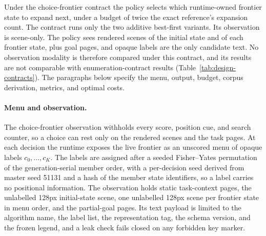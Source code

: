 Under the choice-frontier contract the policy selects which runtime-owned frontier state to expand next, under a budget of twice the exact reference's expansion count. The contract runs only the two additive best-first variants. Its observation is scene-only. The policy sees rendered scenes of the initial state and of each frontier state, plus goal pages, and opaque labels are the only candidate text. No observation modality is therefore compared under this contract, and its results are not comparable with enumeration-contract results (Table~\ref{tab:design-contracts}). The paragraphs below specify the menu, output, budget, corpus derivation, metrics, and optimal costs.

\paragraph{Menu and observation.}
The choice-frontier observation withholds every score, position cue, and search counter, so a choice can rest only on the rendered scenes and the task pages. At each decision the runtime exposes the live frontier as an unscored menu of opaque labels $c_0, \ldots, c_K$. The labels are assigned after a seeded Fisher--Yates permutation of the generation-serial member order, with a per-decision seed derived from master seed 51131 and a hash of the member state identifiers, so a label carries no positional information. The observation holds static task-context pages, the unlabelled 128px initial-state scene, one unlabelled 128px scene per frontier state in menu order, and the partial-goal pages. Its text payload is limited to the algorithm name, the label list, the representation tag, the schema version, and the frozen legend, and a leak check fails closed on any forbidden key marker.

